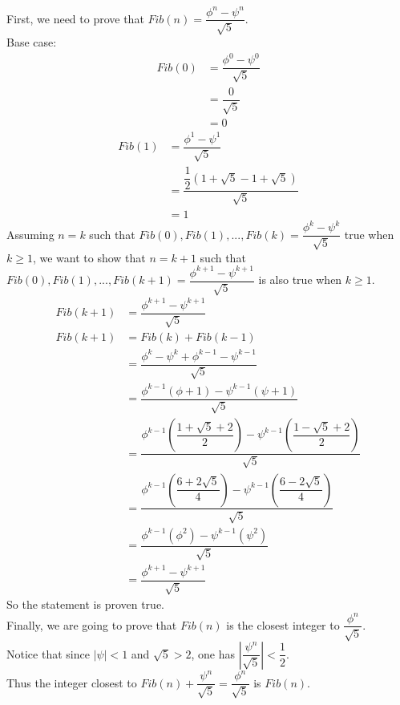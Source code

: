\documentclass{article}
\begin{document}
\noindent
First, we need to prove that ${Fib}(n) = \dfrac{\phi^n-\psi^n}{\sqrt{5}}$. \\
Base case:
\begin{align}
  {Fib}(0) & = \dfrac{\phi^0-\psi^0}{\sqrt{5}} \\
           & = \dfrac{0}{\sqrt{5}} \\
           & = 0
\end{align}
\begin{align}
  {Fib}(1) & = \dfrac{\phi^1-\psi^1}{\sqrt{5}} \\
           & = \dfrac{\dfrac{1}{2}\left(1+\sqrt{5} - 1 + \sqrt{5}\right)}{\sqrt{5}} \\
           & = 1
\end{align}
Assuming ${n} = {k}$ such that ${Fib}(0), {Fib}(1), ..., {Fib}(k) = \dfrac{\phi^k-\psi^k}{\sqrt{5}}$
true when $k\geq1$, we want to show that ${n} = {k + 1}$ such that
${Fib}(0), {Fib}(1), ..., {Fib}(k + 1) = \dfrac{\phi^{k+1}-\psi^{k+1}}{\sqrt{5}}$
is also true when $k\geq1$. \\
\begin{align}
  {Fib}(k + 1) & = \dfrac{\phi^{k+1}-\psi^{k+1}}{\sqrt{5}} \\
  {Fib}(k + 1) & = {Fib}(k) + {Fib}(k - 1) \\
               & = \dfrac{\phi^k-\psi^k + \phi^{k-1} - \psi^{k-1}}{\sqrt{5}} \\
               & = \dfrac{\phi^{k-1}(\phi + 1) - \psi^{k-1}(\psi + 1)}{\sqrt{5}} \\
               & = \dfrac{\phi^{k-1}(\dfrac{1 + \sqrt{5} + 2}{2}) - \psi^{k-1}(\dfrac{1 - \sqrt{5} + 2}{2})}{\sqrt{5}} \\
               & = \dfrac{\phi^{k-1}(\dfrac{6 + 2\sqrt{5}}{4}) - \psi^{k-1}(\dfrac{6 - 2\sqrt{5}}{4})}{\sqrt{5}} \\
               & = \dfrac{\phi^{k-1}(\phi^2) - \psi^{k-1}(\psi^2)}{\sqrt{5}} \\
               & = \dfrac{\phi^{k+1} - \psi^{k+1}}{\sqrt{5}}
\end{align}
So the statement is proven true. \\
Finally, we are going to prove that $Fib(n)$ is the closest integer to $\dfrac{\phi^n}{\sqrt{5}}$. \\
Notice that since $|\psi| < 1$ and $\sqrt{5} > 2$, one has $\left|\dfrac{\psi^n}{\sqrt{5}}\right| < \dfrac{1}{2}$. \\
Thus the integer closest to ${Fib}(n) + \dfrac{\psi^n}{\sqrt{5}} = \dfrac{\phi^n}{\sqrt{5}}$ is ${Fib}(n)$.
\end{document}
